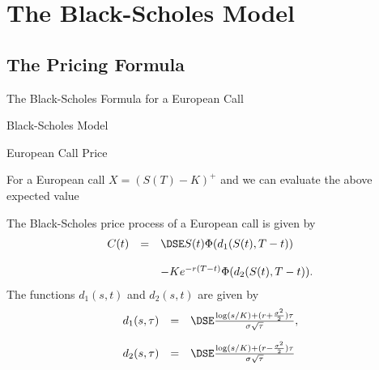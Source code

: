 \section{The Black-Scholes Model}

\begin{frame}
    \frametitle{}
\vspace{0cm}
\begin{center}
\end{center}
\end{frame}

\subsection{The Pricing Formula}


{The Black-Scholes Formula for a European Call}
\begin{center}
\begin{figure}
  \centering
   \qquad
   \qquad
\end{figure}
\end{center}




{ Black-Scholes Model}




{European Call Price}

For a European call $X = (S(T)-K)^+$ and  we can evaluate the
above expected value

The Black-Scholes price
pro\-cess of a European call is given by
$$
\begin{array}{lll}
C(t) &=&\DSE S(t) \Phi(d_1(S(t), T-t))\\*[12pt]
&&- K e^{-r(T-t)} \Phi(d_2(S(t), T-t)).
\end{array}
$$
The functions $d_1(s,t)$ and $d_2(s,t)$ are given by
$$
\begin{array}{lll}
d_1(s,\tau) &=&\DSE \frac{\log(s/K) + (r +
\frac{\sigma^2}{2})\tau}{\sigma \sqrt{\tau}},\\*[12pt] d_2(s,\tau) &=&\DSE
 \frac{\log(s/K) + (r -
\frac{\sigma^2}{2})\tau}{\sigma \sqrt{\tau}}
\end{array}
$$


